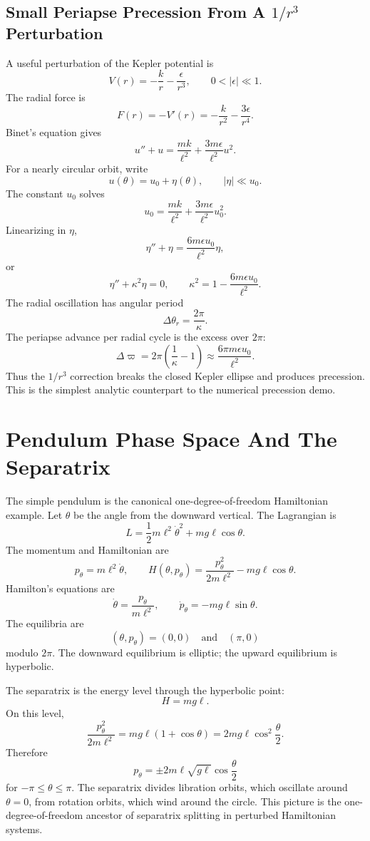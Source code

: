 \subsection[Small Periapse Precession]{Small Periapse Precession From A
\texorpdfstring{\(1/r^3\)}{1/r^3} Perturbation}
\label{subsec:detailed-precession}

A useful perturbation of the Kepler potential is
\[
  V(r)=-\frac{k}{r}-\frac{\epsilon}{r^3},
  \qquad
  0<|\epsilon|\ll1.
\]
The radial force is
\[
  F(r)=-V'(r)=-\frac{k}{r^2}-\frac{3\epsilon}{r^4}.
\]
Binet's equation gives
\[
  u''+u
  =
  \frac{mk}{\ell^2}
  +
  \frac{3m\epsilon}{\ell^2}u^2.
\]
For a nearly circular orbit, write
\[
  u(\theta)=u_0+\eta(\theta),
  \qquad
  |\eta|\ll u_0.
\]
The constant \(u_0\) solves
\[
  u_0=\frac{mk}{\ell^2}+\frac{3m\epsilon}{\ell^2}u_0^2.
\]
Linearizing in \(\eta\),
\[
  \eta''+\eta
  =
  \frac{6m\epsilon u_0}{\ell^2}\eta,
\]
or
\[
  \eta''+\kappa^2\eta=0,
  \qquad
  \kappa^2=1-\frac{6m\epsilon u_0}{\ell^2}.
\]
The radial oscillation has angular period
\[
  \Delta\theta_r=\frac{2\pi}{\kappa}.
\]
The periapse advance per radial cycle is the excess over \(2\pi\):
\[
  \Delta\varpi
  =
  2\pi\left(\frac1\kappa-1\right)
  \approx
  \frac{6\pi m\epsilon u_0}{\ell^2}.
\]
Thus the \(1/r^3\) correction breaks the closed Kepler ellipse and produces
precession. This is the simplest analytic counterpart to the numerical
precession demo.

\section{Pendulum Phase Space And The Separatrix}
\label{sec:detailed-pendulum}

The simple pendulum is the canonical one-degree-of-freedom Hamiltonian example.
Let \(\theta\) be the angle from the downward vertical. The Lagrangian is
\[
  L=\frac12m\ell^2\dot\theta^2+mg\ell\cos\theta.
\]
The momentum and Hamiltonian are
\[
  p_\theta=m\ell^2\dot\theta,
  \qquad
  H(\theta,p_\theta)
  =
  \frac{p_\theta^2}{2m\ell^2}-mg\ell\cos\theta.
\]
Hamilton's equations are
\[
  \dot\theta=\frac{p_\theta}{m\ell^2},
  \qquad
  \dot p_\theta=-mg\ell\sin\theta.
\]
The equilibria are
\[
  (\theta,p_\theta)=(0,0)
  \quad\text{and}\quad
  (\pi,0)
\]
modulo \(2\pi\). The downward equilibrium is elliptic; the upward equilibrium
is hyperbolic.

The separatrix is the energy level through the hyperbolic point:
\[
  H=mg\ell.
\]
On this level,
\[
  \frac{p_\theta^2}{2m\ell^2}
  =
  mg\ell(1+\cos\theta)
  =
  2mg\ell\cos^2\frac{\theta}{2}.
\]
Therefore
\[
  p_\theta
  =
  \pm2m\ell\sqrt{g\ell}\cos\frac{\theta}{2}
\]
for \(-\pi\leq\theta\leq\pi\). The separatrix divides libration orbits, which
oscillate around \(\theta=0\), from rotation orbits, which wind around the
circle. This picture is the one-degree-of-freedom ancestor of separatrix
splitting in perturbed Hamiltonian systems.

